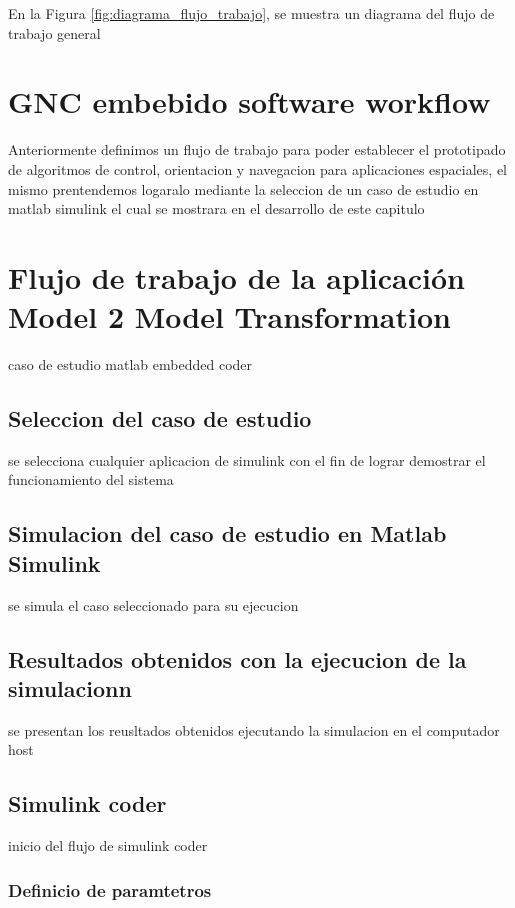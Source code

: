 En la Figura \ref{fig:diagrama_flujo_trabajo}, se muestra un diagrama del flujo de trabajo general 

\section{GNC embebido software workflow}

Anteriormente definimos un flujo de trabajo para poder establecer el prototipado de algoritmos de control, orientacion y navegacion para aplicaciones espaciales, el mismo prentendemos logaralo mediante la seleccion de un caso de estudio en matlab simulink el cual se mostrara en el desarrollo de este capitulo

\section{Flujo de trabajo de la aplicación Model 2 Model Transformation}
caso de estudio matlab embedded coder


\subsection{Seleccion del caso de estudio}

se selecciona cualquier aplicacion de simulink con el fin de lograr demostrar el funcionamiento del sistema

\subsection{Simulacion del caso de estudio en Matlab Simulink}

se simula el caso seleccionado para su ejecucion 

\subsection{Resultados obtenidos con la ejecucion de la simulacionn}

se presentan los reusltados obtenidos ejecutando la simulacion en el computador host

\subsection{Simulink coder}

inicio del flujo de simulink coder 

\subsubsection{Definicio de paramtetros}

